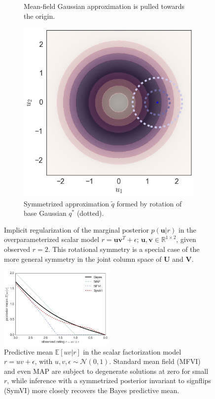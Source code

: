 \documentclass{article}
\newcommand{\N}{\mathcal{N}}
\newcommand{\E}{\mathbb{E}}
\renewcommand{\v}[1]{\mathbf{#1}}
\begin{document}
\begin{figure}[t]
\begin{subfigure}[t]{.3\textwidth}
\caption{Mean-field Gaussian approximation is pulled towards the origin.}
\end{subfigure}
\begin{subfigure}[t]{.3\textwidth}
\includegraphics[width=\textwidth]{rot_symmetric_posterior}
\caption{Symmetrized approximation $\tilde{q}$ formed by rotation
  of base Gaussian $q^*$ (dotted).}
\end{subfigure}
\caption{Implicit regularization of the marginal posterior $p(\v{u} | r)$ in the
  overparameterized scalar model $r = \v{u}\v{v}^T + \epsilon$;
  $\v{u},\v{v} \in \mathbb{R}^{1 \times 2}$, given observed
  $r=2$. This rotational symmetry is a special case of the more general
  symmetry in the joint column space of $\v{U}$ and $\v{V}$.}
\label{fig:rot_demo}
\vspace{-1.3em}
\end{figure}

\begin{figure}
\centering
\includegraphics[width=0.5\textwidth]{signflip_sv_plot}
\caption{Predictive mean $\E[uv | r]$ in the scalar factorization model $r = uv + \epsilon$, with $u,
  v, \epsilon \sim \N(0, 1)$. Standard mean field (MFVI)
  and even MAP are subject to degenerate solutions at zero for small $r$, while
  inference with a symmetrized posterior invariant to signflips (SymVI)
  more closely recovers the Bayes predictive mean.}
\label{fig:signflip_svs}
\end{figure}
\end{document}
